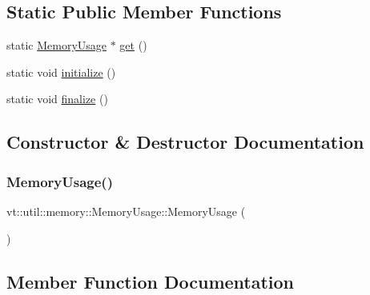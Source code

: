 \subsection*{Static Public Member Functions}
\begin{DoxyCompactItemize}
\item 
static \hyperlink{structvt_1_1util_1_1memory_1_1_memory_usage}{Memory\+Usage} $\ast$ \hyperlink{structvt_1_1util_1_1memory_1_1_memory_usage_a2a626c96dc7ae098ddaece17c4b28d4d}{get} ()
\item 
static void \hyperlink{structvt_1_1util_1_1memory_1_1_memory_usage_abcbd3fd9c8f717b98730ca24c57b8cb1}{initialize} ()
\item 
static void \hyperlink{structvt_1_1util_1_1memory_1_1_memory_usage_afc60586f69bcd56a783da3f1fd6fb78a}{finalize} ()
\end{DoxyCompactItemize}


\subsection{Constructor \& Destructor Documentation}
\mbox{\label{structvt_1_1util_1_1memory_1_1_memory_usage_a5838280c7b2b24ab8ed2aff450b5e98f}} 
\subsubsection{\texorpdfstring{Memory\+Usage()}{MemoryUsage()}}
{\footnotesize\ttfamily vt\+::util\+::memory\+::\+Memory\+Usage\+::\+Memory\+Usage (\begin{DoxyParamCaption}{ }\end{DoxyParamCaption})}



\subsection{Member Function Documentation}
\mbox{\label{structvt_1_1util_1_1memory_1_1_memory_usage_ad047c8acc218403b53ec97c82fa7d7e3}} 
